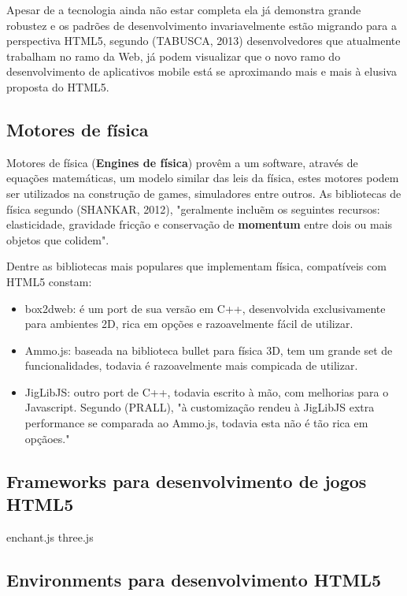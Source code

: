 \documentclass{article}
\begin{document}
Apesar de a tecnologia  ainda não estar completa ela já demonstra grande robustez  e os padrões de desenvolvimento invariavelmente estão migrando para a perspectiva HTML5, segundo (TABUSCA, 2013) desenvolvedores que atualmente trabalham no ramo da Web, já podem visualizar que o novo ramo do desenvolvimento de aplicativos mobile está se aproximando mais e mais à elusiva proposta do HTML5.

\subsection{Motores de física}

Motores de física (\textbf{Engines de física}) provêm a um software, através de equações matemáticas, um modelo similar das leis da física, estes motores podem ser utilizados na construção de games, simuladores entre outros. As bibliotecas de física segundo (SHANKAR, 2012), "geralmente incluẽm os seguintes recursos: elasticidade, gravidade fricção e conservação de \textbf{momentum} entre dois ou mais objetos que colidem".

Dentre as bibliotecas mais populares que implementam física, compatíveis com HTML5 constam:

\begin{itemize}
\item box2dweb: é um port de sua versão em C++, desenvolvida exclusivamente para ambientes 2D, rica em opções e razoavelmente fácil de utilizar.
\item Ammo.js: baseada na biblioteca bullet para física 3D, tem um grande set de funcionalidades, todavia é razoavelmente mais compicada de utilizar.

\item JigLibJS: outro port de C++, todavia escrito à mão, com melhorias para o Javascript.  Segundo (PRALL), "à customização rendeu à JigLibJS extra performance se comparada ao Ammo.js, todavia esta não é tão rica em opçãoes."
\end{itemize}

\subsection{Frameworks para desenvolvimento de jogos HTML5}

enchant.js
three.js

\subsection{Environments para desenvolvimento HTML5}
\end{document}
